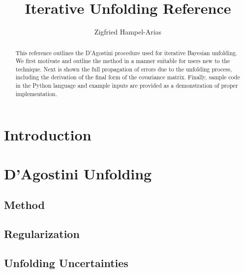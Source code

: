 \documentclass[11pt, letter]{article}
\newcommand\blankpage{%
    \null
    \thispagestyle{empty}%
    \addtocounter{page}{-1}%
    \newpage}
\begin{document}
\titleGP
\afterpage{\blankpage}

\title{Iterative Unfolding Reference}
\author{Zigfried Hampel-Arias}
\maketitle


\begin{abstract}

This reference outlines the D'Agostini procedure used for iterative Bayesian unfolding.
We first motivate and outline the method in a manner suitable for users new to the technique.
Next is shown the full propagation of errors due to the unfolding process, including the derivation
of the final form of the covariance matrix.
Finally, sample code in the Python language and example inputs are provided as a demonstration 
of proper implementation.

\end{abstract}


\tableofcontents
\newpage


\section{Introduction}
\label{introduction_section}
\newpage

\section{D'Agostini Unfolding}

\subsection{Method}\label{unfolding_method_section}


\subsection{Regularization}\label{regularization_section}


\subsection{Unfolding Uncertainties}\label{uncertainties_section}

\newpage
\end{document}
